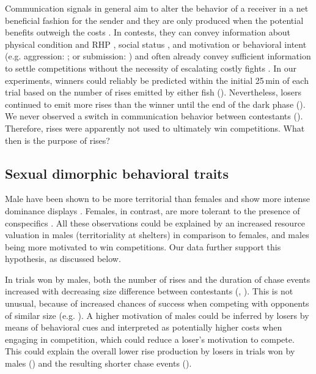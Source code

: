 Communication signals in general aim to alter the behavior of a receiver in a net beneficial fashion for the sender and they are only produced when the potential benefits outweigh the costs \citep{Endler1993, Seyfarth2010}. In contests, they can convey information about physical condition and RHP \citep{Davies1978, Cluttonbrock1979}, social status \citep{Huyghe2005, Fernald2014}, and motivation or behavioral intent (e.g. aggression: \citealp{Triefenbach2008, Kareklas2019}; or submission: \citealp{Hupe2008, Silva2012}) and often already convey sufficient information to settle competitions without the necessity of escalating costly fights \citep{ArnottElwood2009}. In our experiments, winners could reliably be predicted within the initial 25\,min of each trial based on the number of rises emitted by either fish (). Nevertheless, losers continued to emit more rises than the winner until the end of the dark phase (). We never observed a switch in communication behavior between contestants (). Therefore, rises were apparently not used to ultimately win competitions. What then is the purpose of rises?

\subsection{Sexual dimorphic behavioral traits}

Male \lepto{} have been shown to be more territorial than females \citep{Dunlap2002} and show more intense dominance displays \citep{Raab2019}. Females, in contrast, are
more tolerant to the presence of conspecifics \citep{ZupancMaler1993, Cuddy2012}. All these observations could be explained by an increased resource valuation in males (territoriality at shelters) in comparison to females, and males being more motivated to win
competitions. Our data further support this hypothesis, as discussed below.

In trials won by males, both the number of rises and the duration of chase events increased with decreasing size difference between contestants (, ). This is not unusual, because of increased chances of success when competing with opponents of similar size (e.g. \citealp{Cluttonbrock1979, Enquist1990}). A higher motivation of males could be inferred by losers by means of behavioral cues and interpreted as potentially higher costs when engaging in competition, which could reduce a loser's motivation to compete. This could explain the overall lower rise production by losers in trials won by males () and the resulting shorter chase events ().

